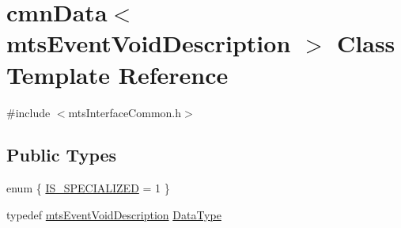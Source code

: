 \hypertarget{classcmn_data_3_01mts_event_void_description_01_4}{}\section{cmn\+Data$<$ mts\+Event\+Void\+Description $>$ Class Template Reference}
\label{classcmn_data_3_01mts_event_void_description_01_4}


{\ttfamily \#include $<$mts\+Interface\+Common.\+h$>$}

\subsection*{Public Types}
\begin{DoxyCompactItemize}
\item 
enum \{ \hyperlink{classcmn_data_3_01mts_event_void_description_01_4_a40ed88ad4390d65cb78e0bbd37058585a8f4c9213f90aafa7f2994e431f5d9418}{I\+S\+\_\+\+S\+P\+E\+C\+I\+A\+L\+I\+Z\+E\+D} = 1
 \}
\item 
typedef \hyperlink{classmts_event_void_description}{mts\+Event\+Void\+Description} \hyperlink{classcmn_data_3_01mts_event_void_description_01_4_ae99d827ac01b4f0ef589606af2924260}{Data\+Type}
\end{DoxyCompactItemize}
